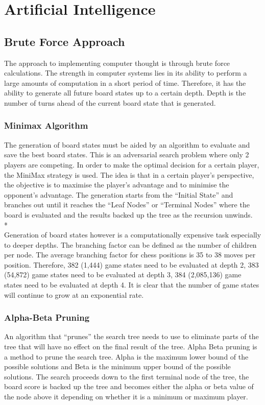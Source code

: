 \documentclass[11pt,a4paper]{article}
\begin{document}
\newpage
\section{Artificial Intelligence}

\subsection{Brute Force Approach}
\indent\indent The approach to implementing computer thought is through brute force calculations. The strength in computer systems lies in its ability to perform a large amounts of computation in a short period of time. Therefore, it has the ability to generate all future board states up to a certain depth. Depth is the number of turns ahead of the current board state that is generated. 

\subsubsection{Minimax Algorithm}
\indent\indent The generation of board states must be aided by an algorithm to evaluate and save the best board states. This is an adversarial search problem where only 2 players are competing. In order to make the optimal decision for a certain player, the MiniMax strategy is used. The idea is that in a certain player’s perspective, the objective is to maximise the player’s advantage and to minimise the opponent’s advantage. The generation starts from the “Initial State” and branches out until it reaches the “Leaf Nodes” or “Terminal Nodes” where the board is evaluated and the results backed up the tree as the recursion unwinds.\cite{chess1}
\\*\\
\indent Generation of board states however is a computationally expensive task especially to deeper depths. The branching factor can be defined as the number of children per node. The average branching factor for chess positions is 35 to 38 moves per position.  Therefore, 382 (1,444) game states need to be evaluated at depth 2, 383 (54,872) game states need to be evaluated at depth 3, 384 (2,085,136) game states need to be evaluated at depth 4. It is clear that the number of game states will continue to grow at an exponential rate.\cite{chess2}

\subsubsection{Alpha-Beta Pruning}
\indent\indent An algorithm that “prunes” the search tree needs to use to eliminate parts of the tree that will have no effect on the final result of the tree. Alpha Beta pruning is a method to prune the search tree. Alpha is the maximum lower bound of the possible solutions and Beta is the minimum upper bound of the possible solutions. The search proceeds down to the first terminal node of the tree, the board score is backed up the tree and becomes either the alpha or beta value of the node above it depending on whether it is a minimum or maximum player. 
\end{document}

